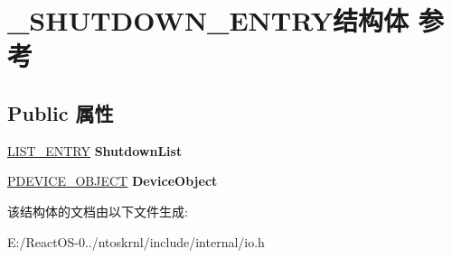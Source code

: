 \hypertarget{struct___s_h_u_t_d_o_w_n___e_n_t_r_y}{}\section{\+\_\+\+S\+H\+U\+T\+D\+O\+W\+N\+\_\+\+E\+N\+T\+R\+Y结构体 参考}
\label{struct___s_h_u_t_d_o_w_n___e_n_t_r_y}
\subsection*{Public 属性}
\begin{DoxyCompactItemize}
\item 
\mbox{\label{struct___s_h_u_t_d_o_w_n___e_n_t_r_y_abcd66f8148eb286fd3005ef71812d766}} 
\hyperlink{struct___l_i_s_t___e_n_t_r_y}{L\+I\+S\+T\+\_\+\+E\+N\+T\+RY} {\bfseries Shutdown\+List}
\item 
\mbox{\label{struct___s_h_u_t_d_o_w_n___e_n_t_r_y_a491b13119e91cacc224097176c1c9174}} 
\hyperlink{struct___d_e_v_i_c_e___o_b_j_e_c_t}{P\+D\+E\+V\+I\+C\+E\+\_\+\+O\+B\+J\+E\+CT} {\bfseries Device\+Object}
\end{DoxyCompactItemize}


该结构体的文档由以下文件生成\+:\begin{DoxyCompactItemize}
\item 
E\+:/\+React\+O\+S-\/0../ntoskrnl/include/internal/io.\+h\end{DoxyCompactItemize}
